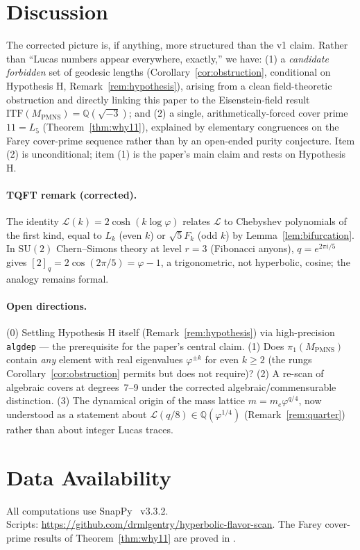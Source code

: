 \documentclass[12pt]{article}
\theoremstyle{definition}
\newcommand{\Q}{\mathbb{Q}}
\newcommand{\ph}{\varphi}
\newcommand{\Lcal}{\mathcal{L}}
\newcommand{\logph}{\log\ph}
\newcommand{\ITF}{\mathrm{ITF}}
\begin{document}
\section{Discussion}

The corrected picture is, if anything, more structured than the v1
claim. Rather than ``Lucas numbers appear everywhere, exactly,'' we
have: (1) a \emph{candidate forbidden} set of geodesic lengths
(Corollary~\ref{cor:obstruction}, conditional on Hypothesis H,
Remark~\ref{rem:hypothesis}), arising from a clean field-theoretic
obstruction and directly linking this paper to the Eisenstein-field
result $\ITF(M_{\mathrm{PMNS}})=\Q(\sqrt{-3})$; and (2) a single,
arithmetically-forced cover prime $11=L_5$
(Theorem~\ref{thm:why11}), explained by elementary congruences on the
Farey cover-prime sequence rather than by an open-ended purity
conjecture. Item (2) is unconditional; item (1) is the paper's main
claim and rests on Hypothesis H.

\paragraph{TQFT remark (corrected).} The identity
$\Lcal(k)=2\cosh(k\logph)$ relates $\Lcal$ to Chebyshev polynomials of
the first kind, equal to $L_k$ (even $k$) or $\sqrt5F_k$ (odd $k$) by
Lemma~\ref{lem:bifurcation}. In $\mathrm{SU}(2)$ Chern--Simons theory
at level $r=3$ (Fibonacci anyons), $q=e^{2\pi i/5}$ gives
$[2]_q=2\cos(2\pi/5)=\ph-1$, a trigonometric, not hyperbolic, cosine;
the analogy remains formal.

\paragraph{Open directions.} (0) Settling Hypothesis H itself
(Remark~\ref{rem:hypothesis}) via high-precision \texttt{algdep} ---
the prerequisite for the paper's central claim. (1) Does
$\pi_1(M_{\mathrm{PMNS}})$ contain
\emph{any} element with real eigenvalues $\ph^{\pm k}$ for
even $k\geq2$ (the rungs Corollary~\ref{cor:obstruction} permits but
does not require)? (2) A re-scan of algebraic covers at
degrees~7--9 under the corrected algebraic/commensurable distinction.
(3) The dynamical origin of the mass lattice $m=m_e\ph^{q/4}$, now
understood as a statement about $\Lcal(q/8)\in\Q(\ph^{1/4})$
(Remark~\ref{rem:quarter}) rather than about integer Lucas traces.

\section*{Data Availability}
All computations use SnapPy~\cite{snappy} v3.3.2.\\
Scripts: \url{https://github.com/drmlgentry/hyperbolic-flavor-scan}. The Farey
cover-prime results of Theorem~\ref{thm:why11} are proved in
\cite{gentry-z5bridge}.
\end{document}
